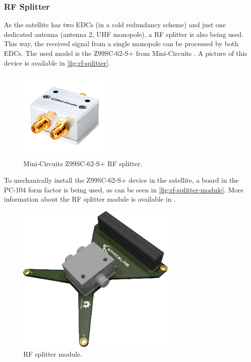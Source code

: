 \subsubsection{RF Splitter}

As the satellite has two EDCs (in a cold redundancy scheme) and just one dedicated antenna (antenna 2, UHF monopole), a RF splitter is also being used. This way, the received signal from a single monopole can be processed by both EDCs. The used model is the Z99SC-62-S+ from Mini-Circuits \cite{z99sc-62-s}. A picture of this device is available in \autoref{fig:rf-splitter}.

\begin{figure}[!ht]
    \begin{center}
        \includegraphics[width=0.4\textwidth]{figures/z99sc-62-s}
        \caption{Mini-Circuits Z99SC-62-S+ RF splitter.}
        \label{fig:rf-splitter}
    \end{center}
\end{figure}

To mechanically install the Z99SC-62-S+ device in the satellite, a board in the PC-104 form factor is being used, as can be seen in \autoref{fig:rf-splitter-module}. More information about the RF splitter module is available in \cite{rf-splitter}.

\begin{figure}[!ht]
    \begin{center}
        \includegraphics[width=0.7\textwidth]{figures/rf-splitter}
        \caption{RF splitter module.}
        \label{fig:rf-splitter-module}
    \end{center}
\end{figure}

